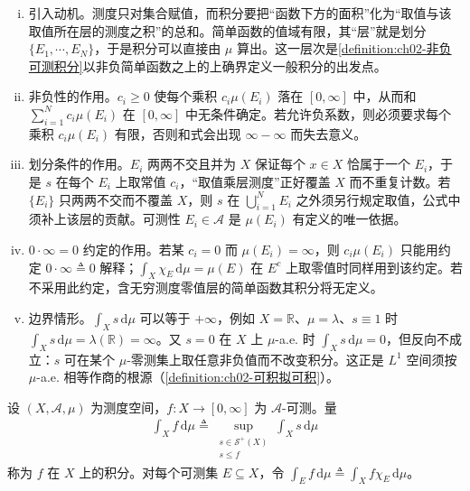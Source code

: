\documentclass[../../main.tex]{subfiles}%
\begin{document}
\begin{remark}\label{remark:ch02-简单函数积分动机}
\begin{enumerate}[(i)]
\item 引入动机。测度只对集合赋值，而积分要把“函数下方的面积”化为“取值与该取值所在层的测度之积”的总和。简单函数的值域有限，其“层”就是划分 $\{E_1,\cdots ,E_N\}$，于是积分可以直接由 $\mu$ 算出。这一层次是\cref{definition:ch02-非负可测积分}以非负简单函数之上的上确界定义一般积分的出发点。
\item 非负性的作用。$c_i\geqslant0$ 使每个乘积 $c_i\mu(E_i)$ 落在 $[0,\infty]$ 中，从而和 $\sum_{i=1}^Nc_i\mu(E_i)$ 在 $[0,\infty]$ 中无条件确定。若允许负系数，则必须要求每个乘积 $c_i\mu(E_i)$ 有限，否则和式会出现 $\infty-\infty$ 而失去意义。
\item 划分条件的作用。$E_i$ 两两不交且并为 $X$ 保证每个 $x\in X$ 恰属于一个 $E_i$，于是 $s$ 在每个 $E_i$ 上取常值 $c_i$，“取值乘层测度”正好覆盖 $X$ 而不重复计数。若 $\{E_i\}$ 只两两不交而不覆盖 $X$，则 $s$ 在 $\bigcup_{i=1}^NE_i$ 之外须另行规定取值，公式中须补上该层的贡献。可测性 $E_i\in\mathscr A$ 是 $\mu(E_i)$ 有定义的唯一依据。
\item $0\cdot\infty=0$ 约定的作用。若某 $c_i=0$ 而 $\mu(E_i)=\infty$，则 $c_i\mu(E_i)$ 只能用约定 $0\cdot\infty\triangleq0$ 解释；$\int_X\chi_E\,\mathrm{d}\mu=\mu(E)$ 在 $E^c$ 上取零值时同样用到该约定。若不采用此约定，含无穷测度零值层的简单函数其积分将无定义。
\item 边界情形。$\int_Xs\,\mathrm{d}\mu$ 可以等于 $+\infty$，例如 $X=\mathbb R$、$\mu=\lambda$、$s\equiv1$ 时 $\int_Xs\,\mathrm{d}\mu=\lambda(\mathbb R)=\infty$。又 $s=0$ 在 $X$ 上 $\mu$-a.e. 时 $\int_Xs\,\mathrm{d}\mu=0$，但反向不成立：$s$ 可在某个 $\mu$-零测集上取任意非负值而不改变积分。这正是 $L^1$ 空间须按 $\mu$-a.e. 相等作商的根源（\cref{definition:ch02-可积拟可积}）。
\end{enumerate}
\end{remark}

\begin{definition}\label{definition:ch02-非负可测积分}\label{definition:ch02-Lebesgue}\label{definition:ch02-Lebesgue积分}
设 $(X,\mathscr A,\mu)$ 为测度空间，$f:X\to[0,\infty]$ 为 $\mathscr A$-可测。量
\begin{align}
\int_Xf\,\mathrm{d}\mu\triangleq\sup_{\substack{s\in\mathscr S^+(X)\\ s\leqslant f}}\int_Xs\,\mathrm{d}\mu \label{align:ch02-2.4}
\end{align}
称为 $f$ 在 $X$ 上的积分。对每个可测集 $E\subseteq X$，令 $\int_Ef\,\mathrm{d}\mu\triangleq\int_Xf\chi_E\,\mathrm{d}\mu$。
\end{definition}
\end{document}
